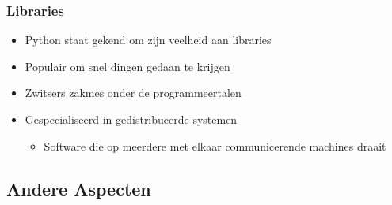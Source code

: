 \begin{frame}
  \frametitle{Libraries}
  \begin{itemize}
    \item Python staat gekend om zijn veelheid aan libraries
    \item Populair om snel dingen gedaan te krijgen
    \item Zwitsers zakmes onder de programmeertalen
  \end{itemize}
  \vskip4mm
  \begin{itemize}
    \item Gespecialiseerd in gedistribueerde systemen
          \begin{itemize}
            \item Software die op meerdere met elkaar communicerende machines draait
          \end{itemize}
  \end{itemize}
\end{frame}

\subsection{Andere Aspecten}

\begin{frame}
  \tableofcontents[currentsubsection]
\end{frame}

